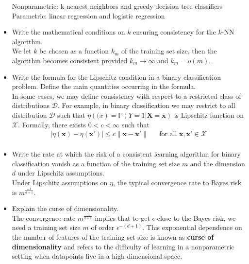 \begin{itemize}
        Nonparametric: k-nearest neighbors and greedy decision tree classifiers\\
        Parametric: linear regression and logistic regression\\

    \item Write the mathematical conditions on $k$ ensuring consistency for the $k$-NN algorithm.\\

        We let $k$ be chosen as a function $k_m$ of the training set size, then the algorithm becomes consistent provided $k_m \rightarrow \infty$ and $k_m = o(m)$.\\
        
    \item Write the formula for the Lipschitz condition in a binary classification problem. Define the main quantities occurring in the formula.\\

        In some cases, we may define consistency with respect to a restricted class of distributions $\mathcal{D}$. For example, in binary classification we may restrict to all distribution $\mathcal{D}$ such that $\eta(\boldsymbol(x) = \mathbb{P}(Y = 1 | \boldsymbol{X} = \boldsymbol{x})$ is Lipschitz function on $\mathcal{X}$. Formally, there exists $0 < c < \infty$ such that
        \begin{equation} 
            \begin{aligned}
                |\eta(\boldsymbol{x}) - \eta(\boldsymbol{x}')| \leq c \|\boldsymbol{x} - \boldsymbol{x}'\| && \text{for all $\boldsymbol{x}, \boldsymbol{x}' \in \mathcal{X}$} \\ 
            \end{aligned}
        \end{equation}

    \item Write the rate at which the risk of a consistent learning algorithm for binary classification vanish as a function of the training set size $m$ and the dimension $d$ under Lipschitz assumptions.\\

        Under Lipschitz assumptions on $\eta$, the typical convergence rate to Bayes risk is $m^{\frac{-1}{d+1}}$.\\

    \item Explain the curse of dimensionality.\\
    
        The convergence rate $m^{\frac{-1}{d+1}}$ implies that to get $\epsilon$-close to the Bayes risk, we need a training set size $m$ of order $\epsilon^{-(d+1)}$. This exponential dependence on the number of features of the training set size is known as \textbf{curse of dimensionality} and refers to the difficulty of learning in a nonparametric setting when datapoints live in a high-dimensional space.\\
    

\end{itemize}
